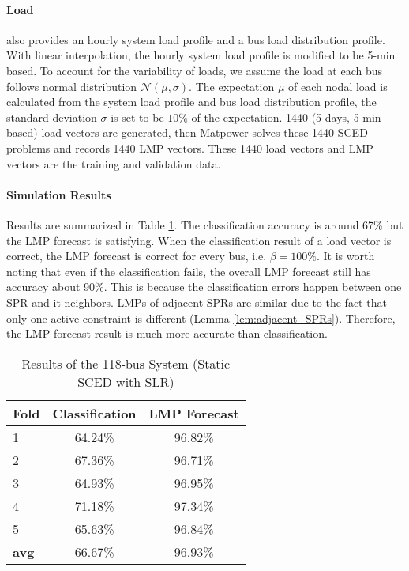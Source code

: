 \documentclass[letterpaper, 11pt]{article}
\theoremstyle{plain}
\theoremstyle{definition}
\begin{document}
\paragraph{Load} \label{par:Load}
\cite{Technology} also provides an hourly system load profile and a bus load distribution profile. With linear interpolation, the hourly system load profile is modified to be 5-min based. To account for the variability of loads, we assume the load at each bus follows normal distribution $\mathcal{N}(\mu,\sigma)$. The expectation $\mu$ of each nodal load is calculated from the system load profile and bus load distribution profile, the standard deviation $\sigma$ is set to be $10\%$ of the expectation. 1440 (5 days, 5-min based) load vectors are generated, then Matpower \cite{zimmerman2011matpower} solves these 1440 SCED problems and records 1440 LMP vectors. These 1440 load vectors and LMP vectors are the training and validation data.


\paragraph{Simulation Results} \label{par:simulation_results}
Results are summarized in Table \ref{tab:classification_accuracy_118bus}.
The classification accuracy is around 67\% but the LMP forecast is satisfying. When the classification result of a load vector is correct, the LMP forecast is correct for every bus, i.e. $\beta = 100\%$. 
It is worth noting that even if the classification fails, the overall LMP forecast still has accuracy about 90\%. This is because the classification errors happen between one SPR and it neighbors. LMPs of adjacent SPRs are similar due to the fact that only one active constraint is different (Lemma \ref{lem:adjacent_SPRs}). Therefore, the LMP forecast result is much more accurate than classification.

\begin{table}[htbp]
  \caption{Results of the 118-bus System (Static SCED with SLR)}
  \label{tab:classification_accuracy_118bus}
  \centering

  \begin{tabular}{l|cc}
  \hline

  \hline
  \textbf{Fold} & \textbf{Classification} & \textbf{LMP Forecast} \\
  \hline
    1 & 64.24\% & 96.82\% \\
    2 & 67.36\% & 96.71\% \\
    3 & 64.93\% & 96.95\% \\
    4 & 71.18\% & 97.34\% \\
    5 & 65.63\% & 96.84\% \\
  \hline
  \textbf{avg} & 66.67\% & 96.93\% \\
  \hline

  \hline
  \end{tabular}
\end{table}
\end{document}
